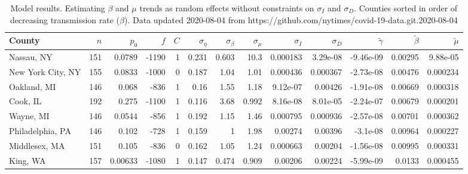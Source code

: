 \documentclass[12pt,letterpaper]{article}
\begin{document}
\begin{appendices}
\begin{sidewaystable}
{%
}\end{sidewaystable}
\clearpage


\begin{sidewaystable}
\caption{\label{tab:uncons}
Model results. Estimating $\beta$ and $\mu$ trends as random effects
without constraints on  $\sigma_I$ and $\sigma_D$. 
Counties sorted in order of decreasing transmission rate ($\beta$).
Data updated 2020-08-04 from https://github.com/nytimes/covid-19-data.git.2020-08-04
}
\centering
{\scriptsize

\begin{tabular}{lrrrrrrrrrrrr}
\hline
 County             &   $n$ &   $p_0$ &   $f$ &   $C$ &   $\sigma_\eta$ &   $\sigma_\beta$ &   $\sigma_\mu$ &   $\sigma_I$ &   $\sigma_D$ &   $\tilde\gamma$ &   $\tilde{\beta}$ &   $\tilde{\mu}$ \\
\hline
 Nassau, NY         & 151   & 0.0789  & -1190 &     1 &           0.231 &            0.603 &         10.3   &    0.000183  &     3.29e-08 &        -9.46e-09 &           0.00295 &       9.88e-05  \\
 New York City, NY  & 155   & 0.0833  & -1000 &     0 &           0.187 &            1.04  &          1.01  &    0.000436  &     0.000367 &        -2.73e-08 &           0.00476 &       0.000234  \\
 Oakland, MI        & 146   & 0.068   &  -836 &     1 &           0.16  &            1.55  &          1.18  &    9.12e-07  &     0.00426  &        -1.91e-08 &           0.00669 &       0.000318  \\
 Cook, IL           & 192   & 0.275   & -1100 &     1 &           0.116 &            3.68  &          0.992 &    8.16e-08  &     8.01e-05 &        -2.24e-07 &           0.00679 &       0.000201  \\
 Wayne, MI          & 146   & 0.0544  &  -856 &     1 &           0.192 &            1.15  &          1.46  &    0.000795  &     0.000936 &        -2.57e-08 &           0.00701 &       0.000362  \\
 Philadelphia, PA   & 146   & 0.102   &  -728 &     1 &           0.159 &            1     &          1.98  &    0.00274   &     0.00396  &        -3.1e-08  &           0.00964 &       0.000227  \\
 Middlesex, MA      & 151   & 0.105   &  -836 &     0 &           0.162 &            1.05  &          1.24  &    0.000663  &     0.00204  &        -1.56e-08 &           0.00995 &       0.000331  \\
 King, WA           & 157   & 0.00633 & -1080 &     1 &           0.147 &            0.474 &          0.909 &    0.00206   &     0.00224  &        -5.99e-09 &           0.0133  &       0.000455  \\

\end{tabular}}
\end{sidewaystable}
\end{appendices}
\end{document}
